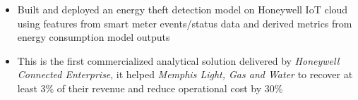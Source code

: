 \documentclass[11pt,a4paper,sans]{moderncv}        %
\begin{document}
\begin{itemize}
{{\begin{itemize}
				\item Built and deployed an energy theft detection model on Honeywell IoT cloud using features from smart meter events/status data and derived metrics from energy consumption model outputs
				\item This is the first commercialized analytical solution delivered by \emph{Honeywell Connected Enterprise}, it helped \emph{Memphis Light, Gas and Water} to recover at least 3\% of their revenue and reduce operational cost by 30\%
			\end{itemize}}}

	\vspace{4pt}


\end{itemize}
\end{document}
